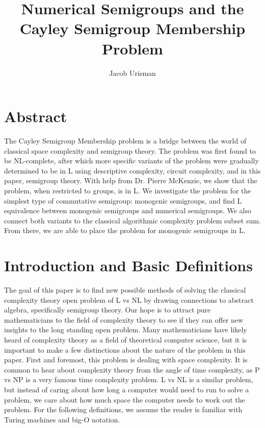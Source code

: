 \documentclass[a4paper,12pt]{article}
\theoremstyle{plain}
\theoremstyle{definition}
\theoremstyle{remark}
\begin{document}
\title{\Large{\textbf{Numerical Semigroups and the Cayley Semigroup Membership Problem}}}
\author{Jacob Urisman}
\date{}
\maketitle
\tableofcontents
\newpage

\section{Abstract}
The Cayley Semigroup Membership problem is a bridge between the world of classical space complexity and semigroup theory. The problem was first found to be NL-complete, after which more specific variants of the problem were gradually determined to be in L using descriptive complexity, circuit complexity, and in this paper, semigroup theory. With help from Dr. Pierre McKenzie, we show that the problem, when restricted to groups, is in L. We investigate the problem for the simplest type of commutative semigroup: monogenic semigroups, and find L equivalence between monogenic semigroups and numerical semigroups. We also connect both variants to the classical algorithmic complexity problem subset sum. From there, we are able to place the problem for monogenic semigroups in L.

\section{Introduction and Basic Definitions}
The goal of this paper is to find new possible methods of solving the classical complexity theory open problem of L vs NL by drawing connections to abstract algebra, specifically semigroup theory. Our hope is to attract pure mathematicians to the field of complexity theory to see if they can offer new insights to the long standing open problem. Many mathematicians have likely heard of complexity theory as a field of theoretical computer science, but it is important to make a few distinctions about the nature of the problem in this paper. First and foremost, this problem is dealing with space complexity. It is common to hear about complexity theory from the angle of time complexity, as P vs NP is a very famous time complexity problem. L vs NL is a similar problem, but instead of caring about how long a computer would need to run to solve a problem, we care about how much space the computer needs to work out the problem. For the following definitions, we assume the reader is familiar with Turing machines and big-O notation.
\end{document}

